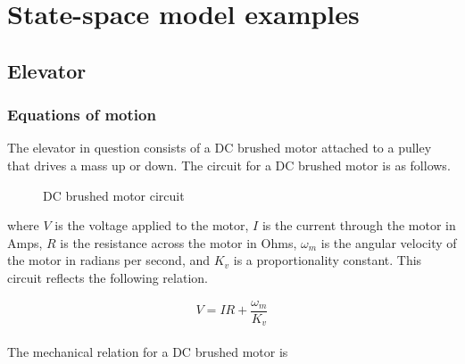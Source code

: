 \section{State-space model examples}

\subsection{Elevator}

\subsubsection{Equations of motion}

The elevator in question consists of a DC brushed motor attached to a pulley
that drives a mass up or down. The circuit for a DC brushed motor is as follows.

\begin{figure}[H]
  \centering


  \caption{DC brushed motor circuit}
  \label{fig:dc_motor_circuit}
\end{figure}

where $V$ is the voltage applied to the motor, $I$ is the current through the
motor in Amps, $R$ is the resistance across the motor in Ohms, $\omega_m$ is the
angular velocity of the motor in radians per second, and $K_v$ is a
proportionality constant. This circuit reflects the following relation.

\begin{equation}
  V = IR + \frac{\omega_m}{K_v} \label{eq:elevator_V}
\end{equation}
\\
The mechanical relation for a DC brushed motor is

